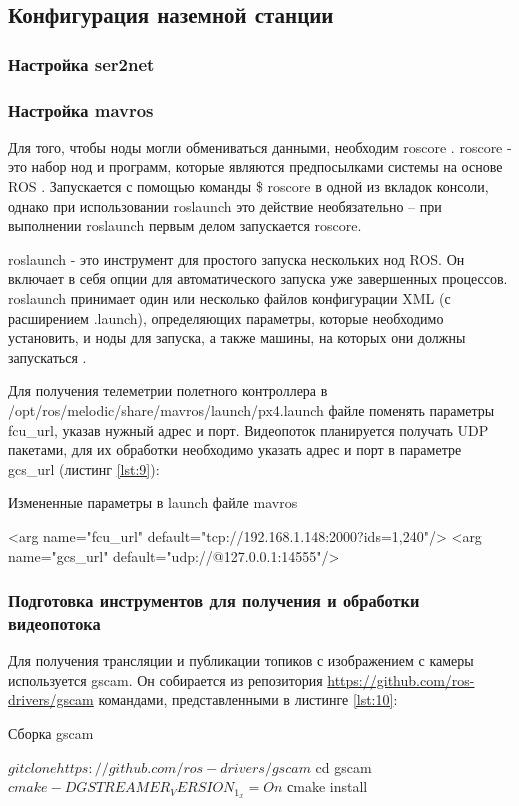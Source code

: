 \subsection{Конфигурация наземной станции}

\subsubsection{Настройка ser2net}

\subsubsection{Настройка mavros}
Для того, чтобы ноды могли обмениваться данными, необходим roscore \cite{pkg}. roscore - это набор нод и программ, которые являются предпосылками системы на основе ROS \cite{ros}. Запускается с помощью команды \$ roscore в одной из вкладок консоли, однако при использовании roslaunch это действие необязательно -- при выполнении roslaunch первым делом запускается roscore.

roslaunch - это инструмент для простого запуска нескольких нод ROS. Он включает в себя опции для автоматического запуска уже завершенных процессов. roslaunch принимает один или несколько файлов конфигурации XML (с расширением .launch), определяющих параметры, которые необходимо установить, и ноды для запуска, а также машины, на которых они должны запускаться \cite{ros}.

Для получения телеметрии полетного контроллера в /opt/ros/melodic/sha\-re/mavros/launch/px4.launch файле поменять параметры fcu\_url, указав нужный адрес и порт. Видеопоток планируется получать UDP пакетами, для их обработки необходимо указать адрес и порт в параметре gcs\_url (листинг \ref{lst:9}):
\begin{Program}[H]
	\caption{Измененные параметры в launch файле mavros} \label{lst:9}
	\begin{MyCode}
	<arg name="fcu_url" default="tcp://192.168.1.148:2000?ids=1,240"/>   
	<arg name="gcs_url" default="udp://@127.0.0.1:14555"/>
	\end{MyCode}
\end{Program}

\subsubsection{Подготовка инструментов для получения и обработки видеопотока}
Для получения трансляции и публикации топиков с изображением с камеры используется gscam. Он собирается из репозитория \url{https://github.com/ros-drivers/gscam} командами, представленными в листинге \ref{lst:10}:
\begin{Program}[H]
	\caption{Сборка gscam} \label{lst:10}
	\begin{MyCode}
	$ git clone https://github.com/ros-drivers/gscam
	$ cd gscam
	$ cmake -DGSTREAMER_VERSION_1_x=On
	$ сmake install
	\end{MyCode}
\end{Program}

